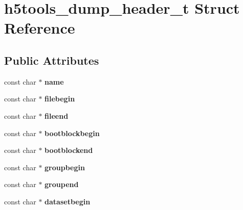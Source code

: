 \hypertarget{structh5tools__dump__header__t}{}\section{h5tools\+\_\+dump\+\_\+header\+\_\+t Struct Reference}
\label{structh5tools__dump__header__t}
\subsection*{Public Attributes}
\begin{DoxyCompactItemize}
\item 
\mbox{\label{structh5tools__dump__header__t_a6d2bc3f78fcb9bd7e66d57b57370aee3}} 
const char $\ast$ {\bfseries name}
\item 
\mbox{\label{structh5tools__dump__header__t_a90905d376ac6801386f4937ff5542439}} 
const char $\ast$ {\bfseries filebegin}
\item 
\mbox{\label{structh5tools__dump__header__t_a119869bdeca31d776797244e37358dc5}} 
const char $\ast$ {\bfseries fileend}
\item 
\mbox{\label{structh5tools__dump__header__t_ac7c76d29c50fefcebf442262f2ff23cd}} 
const char $\ast$ {\bfseries bootblockbegin}
\item 
\mbox{\label{structh5tools__dump__header__t_a112c860a09ee3555e6a47f5e623db68e}} 
const char $\ast$ {\bfseries bootblockend}
\item 
\mbox{\label{structh5tools__dump__header__t_aadac748921eaa85d4a8cb0adb77f7b0e}} 
const char $\ast$ {\bfseries groupbegin}
\item 
\mbox{\label{structh5tools__dump__header__t_a3c1d56031f5735a0600652da0e9985ce}} 
const char $\ast$ {\bfseries groupend}
\item 
\mbox{\label{structh5tools__dump__header__t_aacbe9b5906218b40d0b1ede1f1d53ae0}} 
const char $\ast$ {\bfseries datasetbegin}

\end{DoxyCompactItemize}
